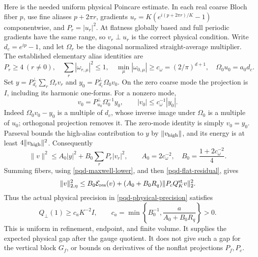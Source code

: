 \documentclass[11pt]{article}
\theoremstyle{remark}
\begin{document}
Here is the needed uniform physical Poincare estimate. In each real
coarse Bloch fiber $p$, use fine aliases $p+2\pi r$, gradients
$u_r=K(e^{i(p+2\pi r)/K}-1)$ componentwise, and $P_r=|u_r|^2$.
At flatness globally based and full periodic gradients have the same
range, so $v_r\perp u_r$ is the correct physical condition. Write
$d_c=e^{ip}-1$, and let $\Omega_r$ be the diagonal normalized
straight-average multiplier. The established elementary alias identities
are
\begin{equation}
 P_r\ge4\ (r\ne0),\quad
 \sum_r|\omega_{r,\mu}|^2\le1,\quad
 \min_\mu|\omega_{0,\mu}|\ge c_\omega=(2/\pi)^{d+1},
 \quad \Omega_0u_0=a_0d_c.
 \label{pqd-alias-inputs}
\end{equation}
Set $y=P_{d_c}^{\perp}\sum_r\Omega_rv_r$ and
$y_0=P_{d_c}^{\perp}\Omega_0v_0$. On the zero coarse mode the projection
is $I$, including its harmonic one-forms. For a nonzero mode,
\begin{equation}
 v_0=P_{u_0}^{\perp}\Omega_0^{-1}y_0,
 \qquad |v_0|\le c_\omega^{-1}|y_0|.
 \label{pqd-central-inverse}
\end{equation}
Indeed $\Omega_0v_0-y_0$ is a multiple of $d_c$, whose inverse image
under $\Omega_0$ is a multiple of $u_0$; orthogonal projection removes
it. The zero-mode identity is simply $v_0=y_0$.
Parseval bounds the high-alias contribution to $y$ by $\|v_{\rm high}\|$,
and its energy is at least $4\|v_{\rm high}\|^2$. Consequently
\begin{equation}
 \|v\|^2\le A_0|y|^2+B_0\sum_rP_r|v_r|^2,
 \qquad A_0=2c_\omega^{-2},\quad
 B_0=\frac{1+2c_\omega^{-2}}4.
 \label{pqd-physical-poincare}
\end{equation}
Summing fibers, using \eqref{pqd-maxwell-lower}, and then
\eqref{pqd-flat-residual}, gives
\begin{equation}
 \|v\|_{2,\eta}^2\le B_0\mathcal E_{\rm res}(v)
 +(A_0+B_0R_q)\|P_cQ_K^{\rm st}v\|_2^2.
 \label{pqd-residual-poincare}
\end{equation}
Thus the actual physical precision in \eqref{pqd-physical-precision}
satisfies
\begin{equation}
 \boxed{\displaystyle Q_\perp(1)\ge c_a K^{-2}I,\qquad
 c_a=\min\left\{B_0^{-1},\frac{a}{A_0+B_0R_q}\right\}>0.}
 \label{pqd-flat-gap}
\end{equation}
This is uniform in refinement, endpoint, and finite volume. It supplies
the expected physical gap after the gauge quotient. It does not give
such a gap for the vertical block $G_f$, or bounds on derivatives of
the nonflat projections $P_f,P_c$.
\end{document}
